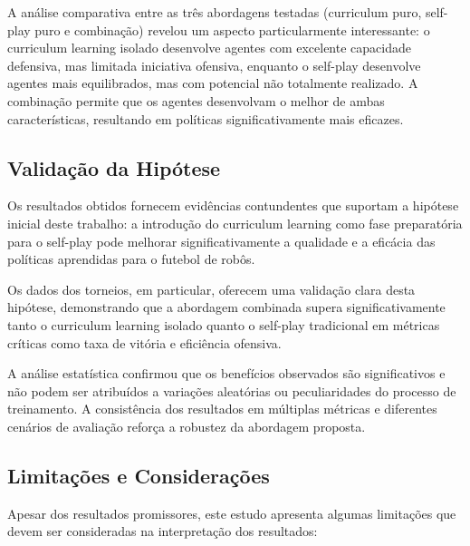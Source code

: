 A análise comparativa entre as três abordagens testadas (curriculum puro, self-play puro e combinação) revelou um aspecto particularmente interessante: o curriculum learning isolado desenvolve agentes com excelente capacidade defensiva, mas limitada iniciativa ofensiva, enquanto o self-play desenvolve agentes mais equilibrados, mas com potencial não totalmente realizado. A combinação permite que os agentes desenvolvam o melhor de ambas características, resultando em políticas significativamente mais eficazes.

\subsection{Validação da Hipótese}

Os resultados obtidos fornecem evidências contundentes que suportam a hipótese inicial deste trabalho: a introdução do curriculum learning como fase preparatória para o self-play pode melhorar significativamente a qualidade e a eficácia das políticas aprendidas para o futebol de robôs.

Os dados dos torneios, em particular, oferecem uma validação clara desta hipótese, demonstrando que a abordagem combinada supera significativamente tanto o curriculum learning isolado quanto o self-play tradicional em métricas críticas como taxa de vitória e eficiência ofensiva.

A análise estatística confirmou que os benefícios observados são significativos e não podem ser atribuídos a variações aleatórias ou peculiaridades do processo de treinamento. A consistência dos resultados em múltiplas métricas e diferentes cenários de avaliação reforça a robustez da abordagem proposta.

\subsection{Limitações e Considerações}

Apesar dos resultados promissores, este estudo apresenta algumas limitações que devem ser consideradas na interpretação dos resultados:

